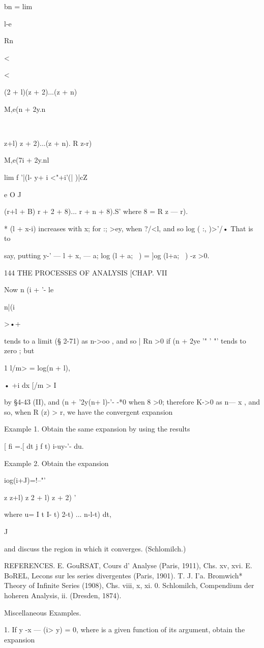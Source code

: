 {bn = lim

l-e

Rn\ \

<

<

(2 + l)(z + 2)...(z + n)

M,e(n + 2y.n\

\ \ {z+l) z + 2)...(z + n). R z-r)

M,e(7i + 2y.nl

lim f '|(l- y+ i <"+i'(| )|cZ

e O J

(r+l + B) r + 2 + 8)... r + n + 8).S' where 8 = R z — r).

* (l + x-i) increases with x; for :; >ey, when ?/<l, and so log ( :,
)>'/• That is to

say, putting y-' — l + x, — a; log (l + a;~ ) = ]og (l+a;~ ) -z >0.

144 THE PROCESSES OF ANALYSIS [CHAP. VII

Now n (i + '- le

n|(i

>•+

tends to a limit (§ 2-71) as n->oo , and so | Rn >0 if (n + 2ye '" '
"' tends to zero ; but

1 l/m> = log(n + l),

• +i dx [/m > I

by §4-43 (II), and (n + '2y(n+ l)-'- -*0 when 8 >0; therefore K->0 as
n— x , and so, when R (z) > r, we have the convergent expansion

Example 1. Obtain the same expansion by using the results

[ fi =.[ dt j f t) i-uy-'- du.

Example 2. Obtain the expansion

iog(i+J)=!--"'

z z+l) z 2 + l) z + 2) '

where u= I t I- t) 2-t) ... n-l-t) dt,

J

and discuss the region in which it converges. (Schlomilch.)

REFERENCES. E. GouRSAT, Cours d' Analyse (Paris, 1911), Chs. xv, xvi.
E. BoREL, Lecons sur les series divergentes (Paris, 1901). T. J. I'a.
Bromwich* Theory of Infinite Series (1908), Chs. viii, x, xi. 0.
Schlomilch, Compendium der hoheren Analysis, ii. (Dresden, 1874).

Miscellaneous Examples.

1. If y -x — (i> y) = 0, where is a given function of its argument,
obtain the expansion

}}
